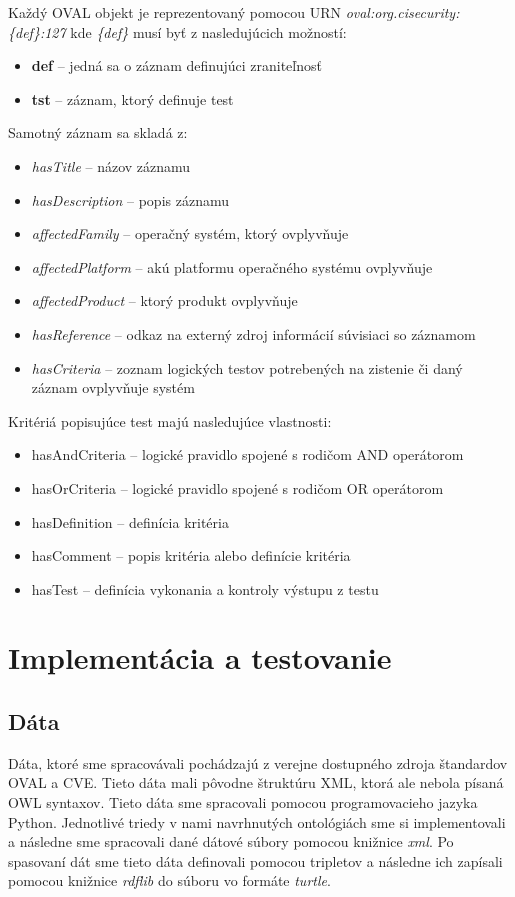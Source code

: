\documentclass[12pt, a4paper, oneside]{book}
\begin{document}
Každý OVAL objekt je reprezentovaný pomocou URN \textit{oval:org.cisecurity:\{def\}:127} kde \textit{\{def\}} musí byť z nasledujúcich možností:
\begin{itemize}
\item \textbf{def} -- jedná sa o záznam definujúci zraniteľnosť
\item \textbf{tst} -- záznam, ktorý definuje test
\end{itemize}
Samotný záznam sa skladá z:
\begin{itemize}
\item \textit{hasTitle} -- názov záznamu
\item \textit{hasDescription} -- popis záznamu
\item \textit{affectedFamily} -- operačný systém, ktorý ovplyvňuje
\item \textit{affectedPlatform} -- akú platformu operačného systému ovplyvňuje
\item \textit{affectedProduct} -- ktorý produkt ovplyvňuje
\item \textit{hasReference} -- odkaz na externý zdroj informácií súvisiaci so záznamom
\item \textit{hasCriteria} -- zoznam logických testov potrebených na zistenie či daný záznam ovplyvňuje systém
\end{itemize}


Kritériá popisujúce test majú nasledujúce vlastnosti:
\begin{itemize}
\item hasAndCriteria -- logické pravidlo spojené s rodičom AND operátorom
\item hasOrCriteria -- logické pravidlo spojené s rodičom OR operátorom
\item hasDefinition -- definícia kritéria
\item hasComment -- popis kritéria alebo definície kritéria
\item hasTest -- definícia vykonania a kontroly výstupu z testu
\end{itemize}



\chapter{Implementácia a testovanie}
\section{Dáta}
Dáta, ktoré sme spracovávali pochádzajú z verejne dostupného zdroja štandardov OVAL a CVE. Tieto dáta mali pôvodne štruktúru XML, ktorá ale nebola písaná OWL syntaxov. Tieto dáta sme spracovali pomocou programovacieho jazyka Python. Jednotlivé triedy v nami navrhnutých ontológiách sme si implementovali a následne sme spracovali dané dátové súbory pomocou knižnice \textit{xml}. Po spasovaní dát sme tieto dáta definovali pomocou tripletov a následne ich zapísali pomocou knižnice \textit{rdflib} do súboru vo formáte \textit{turtle}. 
\end{document}
